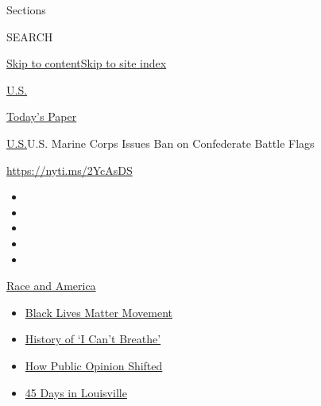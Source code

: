 Sections

SEARCH

\protect\hyperlink{site-content}{Skip to
content}\protect\hyperlink{site-index}{Skip to site index}

\href{https://www.nytimes.com/section/us}{U.S.}

\href{https://myaccount.nytimes.com/auth/login?response_type=cookie\&client_id=vi}{}

\href{https://www.nytimes.com/section/todayspaper}{Today's Paper}

\href{/section/us}{U.S.}\textbar{}U.S. Marine Corps Issues Ban on
Confederate Battle Flags

\href{https://nyti.ms/2YcAsDS}{https://nyti.ms/2YcAsDS}

\begin{itemize}
\item
\item
\item
\item
\item
\end{itemize}

\href{https://www.nytimes.com/news-event/george-floyd-protests-minneapolis-new-york-los-angeles?action=click\&pgtype=Article\&state=default\&region=TOP_BANNER\&context=storylines_menu}{Race
and America}

\begin{itemize}
\tightlist
\item
  \href{https://www.nytimes.com/interactive/2020/07/03/us/george-floyd-protests-crowd-size.html?action=click\&pgtype=Article\&state=default\&region=TOP_BANNER\&context=storylines_menu}{Black
  Lives Matter Movement}
\item
  \href{https://www.nytimes.com/interactive/2020/06/28/us/i-cant-breathe-police-arrest.html?action=click\&pgtype=Article\&state=default\&region=TOP_BANNER\&context=storylines_menu}{History
  of `I Can't Breathe'}
\item
  \href{https://www.nytimes.com/interactive/2020/06/10/upshot/black-lives-matter-attitudes.html?action=click\&pgtype=Article\&state=default\&region=TOP_BANNER\&context=storylines_menu}{How
  Public Opinion Shifted}
\item
  \href{https://www.nytimes.com/interactive/2020/07/16/us/black-lives-matter-protests-louisville-breonna-taylor.html?action=click\&pgtype=Article\&state=default\&region=TOP_BANNER\&context=storylines_menu}{45
  Days in Louisville}
\end{itemize}

